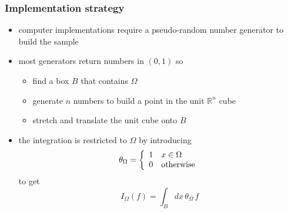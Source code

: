 \begin{frame}[fragile]
%
  \frametitle{Implementation strategy}
%
  \begin{itemize}
%
  \item computer implementations require a pseudo-random number generator to build the sample
%
    \item most generators return numbers in $(0,1)$ so
      \begin{itemize}
      \item find a box $B$ that contains $\Omega$
      \item generate $n$ numbers to build a point in the unit $\mathbb{R}^{n}$ cube
      \item stretch and translate the unit cube onto $B$
      \end{itemize}
%
  \item the integration is restricted to $\Omega$ by introducing
    \begin{equation}
        \theta_{\Omega}
        =
        \left\{
          \begin{array}{ll}
            1 & x \in \Omega \\
            0 & {\rm otherwise}
          \end{array}
        \right.
        \label{eq:theta}
    \end{equation}
    to get
    \begin{equation}
      I_{\Omega} (f)
      =
      \int_{B} dx \, \theta_{\Omega} \, f
      \label{eq:integral-box}
    \end{equation}
%
  \end{itemize}
%
\end{frame}

